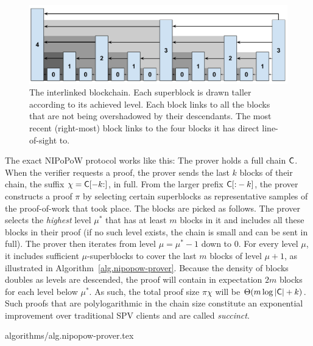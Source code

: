 \begin{figure}[ht]
    \centering
    \includegraphics[width=0.9\columnwidth,keepaspectratio]{figures/level-shadows.pdf}
    \caption{The interlinked blockchain. Each superblock is drawn taller
    according to its achieved level. Each block links to all the blocks that are
    not being overshadowed by their descendants. The most recent (right-most)
    block links to the four blocks it has direct line-of-sight to.}
    \label{fig.hierarchy}
\end{figure}

The exact NIPoPoW protocol works like this: The prover holds a full chain
$\mathsf{C}$. When the verifier requests a proof, the prover sends the last $k$
blocks of their chain, the suffix $\chi = \mathsf{C}[-k{:}]$, in full. From the
larger prefix $\mathsf{C}[{:}-k]$, the prover constructs a proof $\pi$ by selecting
certain superblocks as representative samples of the proof-of-work that took
place. The blocks are picked as follows. The prover selects the \emph{highest}
level $\mu^*$ that has at least $m$ blocks in it and includes all these blocks
in their proof (if no such level exists, the chain is small and can be sent in
full). The prover then iterates from level $\mu = \mu^* - 1$ down to $0$. For
every level $\mu$, it includes sufficient $\mu$-superblocks to cover the last
$m$ blocks of level $\mu + 1$, as illustrated in
Algorithm~\ref{alg.nipopow-prover}. Because the density of blocks doubles as
levels are descended, the proof will contain in expectation $2m$ blocks for each
level below $\mu^*$. As such, the total proof size $\pi \chi$ will be
$\Theta(m\log|\mathsf{C}| + k)$. Such proofs that are polylogarithmic in the chain
size constitute an exponential improvement over traditional SPV clients and are
called \emph{succinct}.

{algorithms/alg.nipopow-prover.tex}


